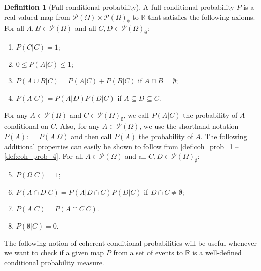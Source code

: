 \documentclass[10pt]{paper}
\theoremstyle{definition}
\newtheorem{definition}{Definition}
\newcommand{\reals}{\mathbb{R}}
\newcommand{\paths}{\Omega}
\newcommand{\power}{\mathcal{P}(\paths)}
\newcommand{\nonemptypower}{\power_{\emptyset}}
\newcommand{\coloneqq}{:\!=}
\begin{document}
\begin{definition}[Full conditional probability]\label{def:cond_prob}
A full conditional probability $P$ is a real-valued map from $\power\times\nonemptypower$ to $\reals$ that satisfies the following axioms. For all $A,B\in\power$ and all \mbox{$C,D\in\nonemptypower$}:
\vspace{5pt}

\begin{enumerate}[label=F\arabic*:,ref=F\arabic*]
\item
$P(C\vert C)=1$;\label{def:coh_prob_1}
\item
$0\leq P(A\vert C)\leq 1$;\label{def:coh_prob_2}
\item
$P(A\cup B\vert C)=P(A\vert C)+P(B\vert C)$ if $A\cap B=\emptyset$;\label{def:coh_prob_3}
\item
$P(A\vert C)=P(A\vert D)P(D\vert C)$ if $A\subseteq D\subseteq C$.\label{def:coh_prob_4}
\end{enumerate}
\vspace{5pt}

\noindent
For any $A\in\power$ and $C\in\nonemptypower$, we call $P(A\vert C)$ the probability of $A$ conditional on $C$. Also, for any $A\in\power$, we use the shorthand notation $P(A)\coloneqq P(A\vert\paths)$ and then call $P(A)$ the probability of $A$.
The following additional properties can easily be shown to follow from \ref{def:coh_prob_1}--\ref{def:coh_prob_4}. For all $A\in\power$ and all $C,D\in\nonemptypower$:
\vspace{5pt}

\begin{enumerate}[label=F\arabic*:,ref=F\arabic*]
 \setcounter{enumi}{4}
\item
$P(\Omega\vert C)=1$;\label{def:coh_prob_5}
\item
$P(A\cap D\vert C)=P(A\vert D\cap C)P(D\vert C)$ if $D\cap C\neq\emptyset$;\label{def:coh_prob_6}
\item
$P(A\vert C)=P(A\cap C\vert C)$.\label{def:coh_prob_7}
\item
$P(\emptyset\vert C)=0$.\label{def:coh_prob_8}
\end{enumerate}
\vspace{5pt}

\end{definition}


The following notion of coherent conditional probabilities will be useful whenever we want to check if a given map $P$ from a set of events to $\reals$ is a well-defined conditional probability measure.
\end{document}
